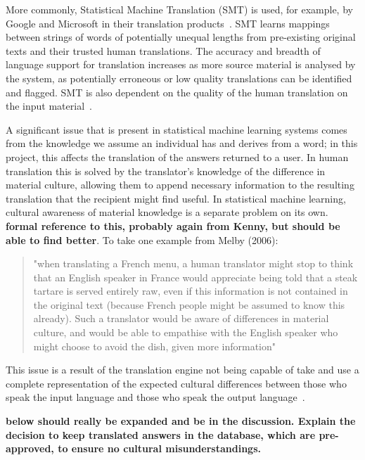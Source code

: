 \documentclass{article}
\begin{document}
More commonly, Statistical Machine Translation (SMT) is used, for example, by Google and Microsoft in their translation products~\cite{kenny2011ethics, Google_Translate_Research}.  SMT learns mappings between strings of words of potentially unequal lengths from pre-existing original texts and their trusted human translations.  The accuracy and breadth of language support for translation increases as more source material is analysed by the system, as potentially erroneous or low quality translations can be identified and flagged.  SMT is also dependent on the quality of the human translation on the input material~\cite{kenny2011ethics}.

A significant issue that is present in statistical machine learning systems comes from the knowledge we assume an individual has and derives from a word; in this project, this affects the translation of the answers returned to a user.  In human translation this is solved by the translator's knowledge of the difference in material culture, allowing them to append necessary information to the resulting translation that the recipient might find useful.  In statistical machine learning, cultural awareness of material knowledge is a separate problem on its own.  {\bf formal reference to this, probably again from Kenny, but should be able to find better}.  To take one example from Melby (2006):

\blockquote{"when translating a French menu, a human translator might stop to think that an English speaker in France would appreciate being told that a steak tartare is served entirely raw, even if this information is not contained in the original text (because French people might be assumed to know this already). Such a translator would be aware of differences in material culture, and would be able to empathise with the English speaker who might choose to avoid the dish, given more information"~\cite{melby2006can, kenny2011ethics}}

This issue is a result of the translation engine not being capable of take and use a complete representation of the expected cultural differences between those who speak the input language and those who speak the output language~\cite{melby2006can}.

{\bf below should really be expanded and be in the discussion.  Explain the decision to keep translated answers in the database, which are pre-approved, to ensure no cultural misunderstandings.}
\end{document}
